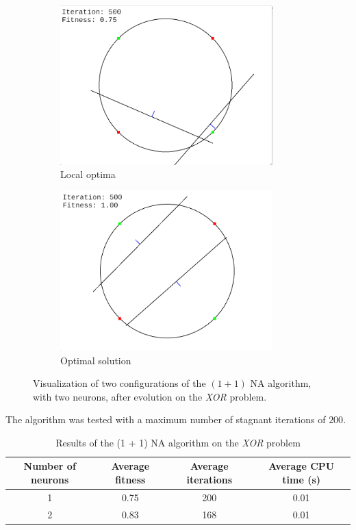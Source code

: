\begin{figure}
    \centering
    \begin{subfigure}{0.45\textwidth}
        \centering
        \includegraphics[width=0.9\textwidth]{Pictures/na-xor-localopt}
       \caption{Local optima}
    \end{subfigure}\hfill
    \begin{subfigure}{0.45\textwidth}
        \centering
        \includegraphics[width=0.9\textwidth]{Pictures/na-xor-opt}
        \caption{Optimal solution}
    \end{subfigure}
    \caption{Visualization of two configurations of the $(1 + 1)$ NA algorithm, with two neurons, after evolution on the \textit{XOR} problem.}
    \label{fig:na_xor_visual}
\end{figure}

\begin{table}
    \caption{Results of the (1 + 1) NA algorithm on the \textit{XOR} problem}{The algorithm was tested with a maximum number of stagnant iterations of $200$.}
    \centering
    \label{tab:na_xor}
    \begin{tabular}{ |c|c|c|c| }
        \hline
        Number of neurons & Average fitness & Average iterations & Average CPU time (s) \\
        \hline
        1 & 0.75 & 200 & 0.01 \\
        \hline
        2 & 0.83 & 168 & 0.01 \\
        \hline\hline
    \end{tabular}
\end{table}

